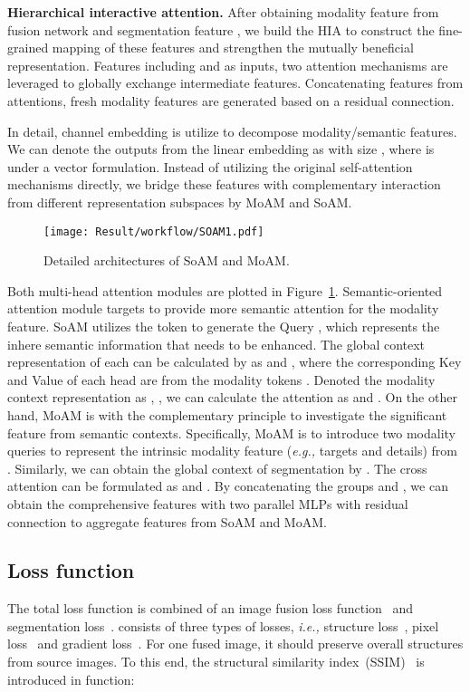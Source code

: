 \documentclass[10pt,twocolumn,letterpaper]{article}
\begin{document}
\textbf{Hierarchical interactive attention.} After obtaining modality feature  from fusion network and segmentation feature , we build the HIA to construct the fine-grained mapping of these features and strengthen the mutually beneficial representation. Features including  and  as inputs, two attention mechanisms  are leveraged to globally exchange intermediate features. Concatenating features from attentions, fresh modality features are generated  based on a residual connection. 

In detail, channel embedding is utilize to decompose modality/semantic features.
We can denote the outputs from the linear embedding as  with size , where  is under a vector formulation. Instead of utilizing the original self-attention mechanisms directly, we bridge these features with complementary interaction   from different representation subspaces by MoAM and SoAM. 

\begin{figure}[!htb]
	\centering
	\setlength{\tabcolsep}{1pt} 
	
	\texttt{[image: Result/workflow/SOAM1.pdf]}
	
	\caption{Detailed architectures of SoAM and MoAM.}
	\label{fig:SOAMMOAM}
\end{figure}

Both multi-head attention modules are plotted in Figure~\ref{fig:SOAMMOAM}. Semantic-oriented attention module targets to provide more semantic attention for the modality feature. SoAM utilizes the token  to generate the Query
, which represents the inhere semantic information that needs to be enhanced. The global context representation of each can be calculated by as  and , where the corresponding Key and Value of each head are from the modality tokens . Denoted the modality context representation as
, , we can calculate the attention as  and .
On the other hand, MoAM is with the complementary principle to investigate the significant feature from semantic contexts. Specifically, MoAM is to introduce two modality queries  to represent the intrinsic modality feature (\textit{e.g.,} targets and details) from .  Similarly, we can obtain the global context of segmentation  by  . The cross attention can be formulated as  and . By concatenating the groups  and , we can obtain the comprehensive features with two parallel MLPs with residual connection to aggregate features from SoAM and MoAM.

\subsection{Loss function}
The total loss function is combined of an image fusion loss function~ and segmentation loss~.  consists of three types of losses, \emph{i.e.,} structure loss~, pixel loss~ and gradient loss~. For one fused image, it should preserve overall structures from source images. To this end, the structural similarity index~(SSIM)~\cite{wang2004image,ma2022practical,wu2022breaking,liu2019knowledge} is introduced in function: 
\vspace{-0.2cm} 
\end{document}
